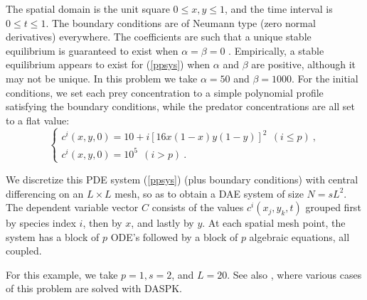 The spatial domain is the unit square $0 \leq x,y \leq 1$, and the
time interval is $0 \leq t \leq 1$.  The boundary conditions are of
Neumann type (zero normal derivatives) everywhere.  The coefficients
are such that a unique stable equilibrium is guaranteed to exist when
$\alpha = \beta = 0$ \cite{Br86}.  Empirically, a stable equilibrium
appears to exist for (\ref{ppsys}) when $\alpha$ and $\beta$ are
positive, although it may not be unique. In this problem we take
$\alpha = 50$ and $\beta = 1000$.  For the initial conditions, we set
each prey concentration to a simple polynomial profile satisfying the
boundary conditions, while the predator concentrations are all set to
a flat value:
\[
\left\{ \begin{array}{l}
c^i(x,y,0) = 10 + i [16x(1 - x)y(1 - y)]^2 ~~ (i \leq p) ~, \\
c^i(x,y,0) = 10^5 ~~ (i > p) ~.
\end{array} \right.
\]

We discretize this PDE system (\ref{ppsys}) (plus boundary conditions)
with central differencing on an $L \times L$ mesh, so as to obtain a
DAE system of size $N = s L^2$.  The dependent variable vector $C$
consists of the values $c^i(x_j,y_k,t)$ grouped first by species index
$i$, then by $x$, and lastly by $y$.  At each spatial mesh point, the
system has a block of $p$ ODE's followed by a block of $p$ algebraic
equations, all coupled.

For this example, we take $p = 1, s = 2$, and $L = 20$.  See also 
\cite{BrHiPe94}, where various cases of this problem are solved with DASPK.

